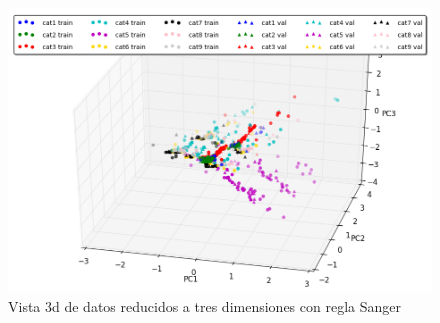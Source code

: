 \begin{figure}[ht!]
	\centering
	\includegraphics[width=0.8\linewidth]{img/parte1-vista3d-sanger.png}

	\caption{Vista 3d de datos reducidos a tres dimensiones con regla Sanger}
\end{figure}

